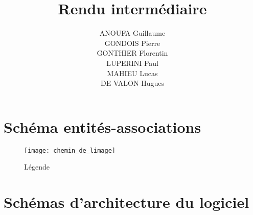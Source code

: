 \documentclass[a4paper, 10pt, french]{article}
\title{Rendu intermédiaire}
\author{
    ANOUFA Guillaume
    \\ GONDOIS Pierre
    \\ GONTHIER Florentin
    \\ LUPERINI Paul
    \\ MAHIEU Lucas
    \\ DE VALON Hugues
}
\begin{document}
\maketitle

\section{Schéma entités-associations}
{
    \begin{figure}[ht!]
        \texttt{[image: chemin\_de\_limage]}
        \centering
        \caption{Légende}
    \end{figure}

}

\section{Schémas d'architecture du logiciel}
{
}

\end{document}
